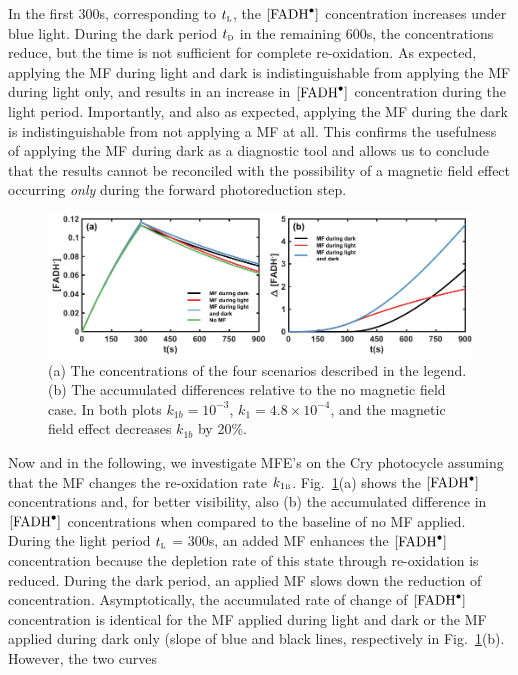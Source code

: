 \documentclass[twoside,twocolumn,9pt]{article}
\begin{document}
In the first 300s, corresponding to $t_{\textsc{l}}$, the $[\ce{FADH^{.}}]$ concentration increases under blue light. During the 
dark period $t_{\textsc{d}}$ in the remaining 600s, the concentrations reduce, but the time is not sufficient for complete 
re-oxidation. As expected, applying the MF during light and dark is indistinguishable from applying the MF during light only, and 
results in an increase in $[\ce{FADH^{.}}]$ concentration during the light period. Importantly, and also as expected, applying the 
MF during the dark is indistinguishable from not applying a MF at all. This confirms the usefulness of applying the MF during dark 
as a diagnostic tool and allows us to conclude that the results \cite{Pooam2019} cannot be reconciled with the possibility of a 
magnetic field effect occurring \emph{only} during the forward photoreduction step.
\begin{figure}[h]
	\centering
	\includegraphics{concAndAccDiff.pdf}
	\caption{(a) The concentrations of the four scenarios described in the legend. (b) The accumulated differences relative to the 
		no magnetic field case. In both plots $k_{1b} = 10^{-3}$, $k_{1} = 4.8 \times 10^{-4}$, and the magnetic field effect 
		decreases $k_{1b}$ by 20\%.}
	\label{fig:concAndAccDiff}
\end{figure}
Now and in the following, we investigate MFE's on the Cry photocycle assuming that the MF changes the re-oxidation rate 
$k_{1\textsc{b}}$. Fig.~\ref{fig:concAndAccDiff}(a) shows the $[\ce{FADH^{.}}]$ concentrations and, for better visibility, also (b) 
the accumulated difference in $[\ce{FADH^{.}}]$ concentrations when compared to the baseline of no MF applied. During the light 
period $t_{\textsc{l}}$ = 300s, an added MF enhances the $[\ce{FADH^{.}}]$ concentration because the depletion rate of this state 
through re-oxidation is reduced. During the dark period, an applied MF slows down the reduction of concentration. Asymptotically, 
the accumulated rate of change of $[\ce{FADH^{.}}]$ concentration is identical for the MF applied during light and dark or the MF 
applied during dark only (slope of blue and black lines, respectively in Fig.~\ref{fig:concAndAccDiff}(b). However, the two curves 
\end{document}
